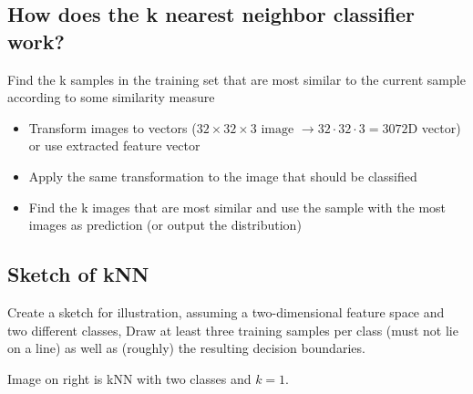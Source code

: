\subsection{How does the k nearest neighbor classifier work?}
Find the k samples in the training set that are most similar to the current sample according to some similarity measure
\begin{itemize}
\item Transform images to vectors ($32\times 32\times 3 \text{ image }\to 32\cdot 32\cdot 3 = 3072$D vector) or use extracted feature vector
\item Apply the same transformation to the image that should be classified
\item Find the k images that are most similar and use the sample with the most images as prediction (or output the distribution)
\end{itemize}

\subsection{Sketch of kNN}
\begin{minipage}{0.65\textwidth}
{Create a sketch for illustration, assuming a two-dimensional feature space and two different classes, Draw at least three training samples per class (must not lie on a line) as well as (roughly) the resulting decision boundaries.}

Image on right is kNN with two classes and $k=1$.
\end{minipage}
\begin{minipage}{0.4\textwidth}

\end{minipage}
